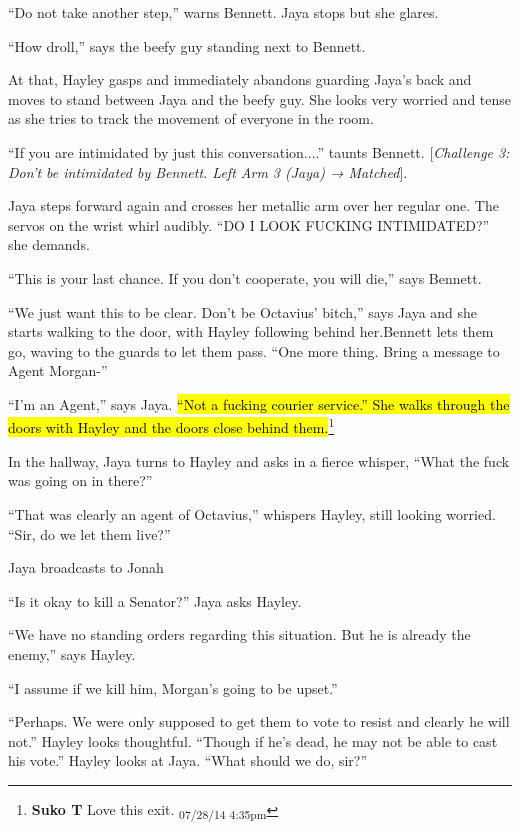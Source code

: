 ``Do not take another step,'' warns Bennett.  Jaya stops but she glares.

``How droll,'' says the beefy guy standing next to Bennett.

At that, Hayley gasps and immediately abandons guarding Jaya's back and moves to stand between Jaya and the beefy guy.  She looks very worried and tense as she tries to track the movement of everyone in the room.

``If you are intimidated by just this conversation....'' taunts Bennett. {[}\textit{Challenge 3: Don't be intimidated by Bennett.   Left Arm 3 (Jaya) → Matched}{]}.

Jaya steps forward again and crosses her metallic arm over her regular one.  The servos on the wrist whirl audibly.   ``DO I LOOK FUCKING INTIMIDATED?'' she demands.  

``This is your last chance.  If you don't cooperate, you will die,'' says Bennett.

``We just want this to be clear.  Don't be Octavius' bitch,'' says Jaya and she starts walking to the door, with Hayley following behind her.Bennett lets them go, waving to the guards to let them pass.  ``One more thing.  Bring a message to Agent Morgan-''

``I'm an Agent,'' says Jaya.  \hl{``Not a fucking courier service.''  She walks through the doors with Hayley and the doors close behind them.}\footnote{\textbf{Suko T }Love this exit. \textsubscript{07/28/14 4:35pm}}



In the hallway, Jaya turns to Hayley and asks in a fierce whisper, ``What the fuck was going on in there?''

``That was clearly an agent of Octavius,'' whispers Hayley, still looking worried.  ``Sir, do we let them live?''

Jaya broadcasts to Jonah   

``Is it okay to kill a Senator?'' Jaya asks Hayley.

``We have no standing orders regarding this situation.  But he is already the enemy,'' says Hayley.

``I assume if we kill him, Morgan's going to be upset.''

``Perhaps.  We were only supposed to get them to vote to resist and clearly he will not.''  Hayley looks thoughtful.  ``Though if he's dead, he may not be able to cast his vote.''  Hayley looks at Jaya.  ``What should we do, sir?''

